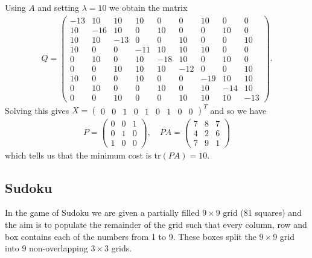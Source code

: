 \documentclass{article}
\begin{document}
\noindent Using \(A\) and setting \(\lambda = 10\) we obtain the matrix
\begin{align*}
    Q = \begin{pmatrix}
        -13 & 10 & 10 & 10 & 0 & 0 & 10 & 0 & 0 \\
        10 & -16 & 10 & 0 & 10 & 0 & 0 & 10 & 0 \\
        10 & 10 & -13 & 0 & 0 & 10 & 0 & 0 & 10 \\
        10 & 0 & 0 & -11 & 10 & 10 & 10 & 0 & 0 \\
        0 & 10 & 0 & 10 & -18 & 10 & 0 & 10 & 0 \\
        0 & 0 & 10 & 10 & 10 & -12 & 0 & 0 & 10 \\
        10 & 0 & 0 & 10 & 0 & 0 & -19 & 10 & 10 \\
        0 & 10 & 0 & 0 & 10 & 0 & 10 & -14 & 10 \\
        0 & 0 & 10 & 0 & 0 & 10 & 10 & 10 & -13
    \end{pmatrix}.
\end{align*}
Solving this gives \(X = \begin{pmatrix}
    0 & 0 & 1 & 0 & 1 & 0 & 1 & 0 & 0
\end{pmatrix}^T\)
and so we have \begin{align*}
    P = \begin{pmatrix}
        0 & 0 & 1 \\
        0 & 1 & 0 \\
        1 & 0 & 0
    \end{pmatrix}, \quad PA = \begin{pmatrix}
        7 & 8 & 7 \\
        4 & 2 & 6 \\
        7 & 9 & 1
    \end{pmatrix}
\end{align*}
which tells us that the minimum cost is \(\text{tr}(PA) = 10\).
\subsection{Sudoku}

In the game of Sudoku we are given a partially filled \(9 \times 9\) grid (81 squares) and the aim is to populate the remainder of the grid such that every column, row and box contains each of the numbers from 1 to 9. These boxes split the \(9 \times 9\) grid into 9 non-overlapping \(3 \times 3\) grids.\\
\end{document}
